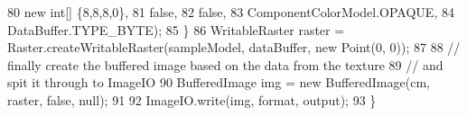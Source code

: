 \begin{DoxyCode}
80                     \textcolor{keyword}{new} \textcolor{keywordtype}{int}[] \{8,8,8,0\},
81                     \textcolor{keyword}{false},
82                     \textcolor{keyword}{false},
83                     ComponentColorModel.OPAQUE,
84                     DataBuffer.TYPE\_BYTE);
85         \}
86         WritableRaster raster = Raster.createWritableRaster(sampleModel, dataBuffer, \textcolor{keyword}{new} Point(0, 0));
87 
88         \textcolor{comment}{// finally create the buffered image based on the data from the texture}
89         \textcolor{comment}{// and spit it through to ImageIO}
90         BufferedImage img = \textcolor{keyword}{new} BufferedImage(cm, raster, \textcolor{keyword}{false}, null);
91         
92         ImageIO.write(img, format, output);
93     \}
\end{DoxyCode}
